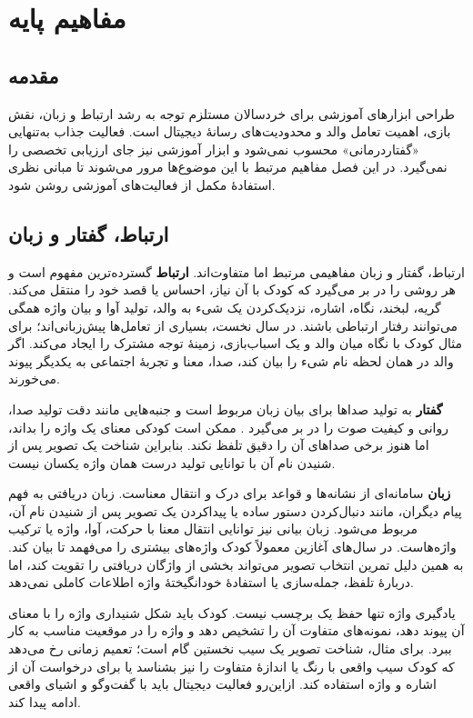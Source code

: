 \chapter{مفاهیم پایه}
\label{ch:background}

\section{مقدمه}

طراحی ابزارهای آموزشی برای خردسالان مستلزم توجه به رشد ارتباط و زبان، نقش بازی، اهمیت تعامل والد و محدودیت‌های رسانهٔ دیجیتال است. فعالیت جذاب به‌تنهایی «گفتاردرمانی» محسوب نمی‌شود و ابزار آموزشی نیز جای ارزیابی تخصصی را نمی‌گیرد. در این فصل مفاهیم مرتبط با این موضوع‌ها مرور می‌شوند تا مبانی نظری استفادهٔ مکمل از فعالیت‌های آموزشی روشن شود.

\section{ارتباط، گفتار و زبان}

ارتباط، گفتار و زبان مفاهیمی مرتبط اما متفاوت‌اند. \textbf{ارتباط} گسترده‌ترین مفهوم است و هر روشی را در بر می‌گیرد که کودک با آن نیاز، احساس یا قصد خود را منتقل می‌کند. گریه، لبخند، نگاه، اشاره، نزدیک‌کردن یک شیء به والد، تولید آوا و بیان واژه همگی می‌توانند رفتار ارتباطی باشند. در سال نخست، بسیاری از تعامل‌ها پیش‌زبانی‌اند؛ برای مثال کودک با نگاه میان والد و یک اسباب‌بازی، زمینهٔ توجه مشترک را ایجاد می‌کند. اگر والد در همان لحظه نام شیء را بیان کند، صدا، معنا و تجربهٔ اجتماعی به یکدیگر پیوند می‌خورند.

\textbf{گفتار} به تولید صداها برای بیان زبان مربوط است و جنبه‌هایی مانند دقت تولید صدا، روانی و کیفیت صوت را در بر می‌گیرد \cite{NIDCDMilestones2022}. ممکن است کودکی معنای یک واژه را بداند، اما هنوز برخی صداهای آن را دقیق تلفظ نکند. بنابراین شناخت یک تصویر پس از شنیدن نام آن با توانایی تولید درست همان واژه یکسان نیست.

\textbf{زبان} سامانه‌ای از نشانه‌ها و قواعد برای درک و انتقال معناست. زبان دریافتی به فهم پیام دیگران، مانند دنبال‌کردن دستور ساده یا پیداکردن یک تصویر پس از شنیدن نام آن، مربوط می‌شود. زبان بیانی نیز توانایی انتقال معنا با حرکت، آوا، واژه یا ترکیب واژه‌هاست. در سال‌های آغازین معمولاً کودک واژه‌های بیشتری را می‌فهمد تا بیان کند. به همین دلیل تمرین انتخاب تصویر می‌تواند بخشی از واژگان دریافتی را تقویت کند، اما دربارهٔ تلفظ، جمله‌سازی یا استفادهٔ خودانگیختهٔ واژه اطلاعات کاملی نمی‌دهد.

یادگیری واژه تنها حفظ یک برچسب نیست. کودک باید شکل شنیداری واژه را با معنای آن پیوند دهد، نمونه‌های متفاوت آن را تشخیص دهد و واژه را در موقعیت مناسب به کار ببرد. برای مثال، شناخت تصویر یک سیب نخستین گام است؛ تعمیم زمانی رخ می‌دهد که کودک سیب واقعی با رنگ یا اندازهٔ متفاوت را نیز بشناسد یا برای درخواست آن از اشاره و واژه استفاده کند. ازاین‌رو فعالیت دیجیتال باید با گفت‌وگو و اشیای واقعی ادامه پیدا کند.

